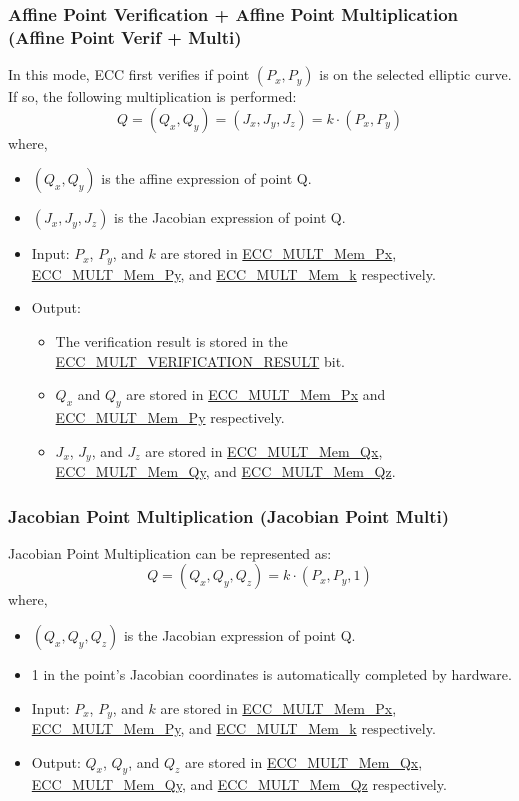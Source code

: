 \documentclass[main\_\_EN.tex]{subfiles}
\begin{document}
\subsubsection{Affine Point Verification + Affine Point Multiplication (Affine Point Verif + Multi)}

In this mode, ECC first verifies if point $(P_x,P_y)$ is on the selected elliptic curve. If so, the following multiplication is performed:
\[
Q = (Q_x,Q_y) = (J_x,J_y,J_z) = k \cdot (P_x,P_y)
\]
where,
\begin{itemize}
    \item $(Q_x,Q_y)$ is the affine expression of point Q.
    \item $(J_x,J_y,J_z)$ is the Jacobian expression of point Q.
    \item Input: $P_x$, $P_y$, and $k$ are stored in \hyperref[tab:ecc-memory]{ECC\_MULT\_Mem\_Px}, \hyperref[tab:ecc-memory]{ECC\_MULT\_Mem\_Py}, and \hyperref[tab:ecc-memory]{ECC\_MULT\_Mem\_k} respectively.
    \item Output:
    \begin{itemize}
        \item The verification result is stored in the \hyperref[fielddesc:ECCMULTVERIFICATIONRESULT]{ECC\_MULT\_VERIFICATION\_RESULT} bit.
        \item $Q_x$ and $Q_y$ are stored in \hyperref[tab:ecc-memory]{ECC\_MULT\_Mem\_Px} and \hyperref[tab:ecc-memory]{ECC\_MULT\_Mem\_Py} respectively.
        \item $J_x$, $J_y$, and $J_z$ are stored in \hyperref[tab:ecc-memory]{ECC\_MULT\_Mem\_Qx}, \hyperref[tab:ecc-memory]{ECC\_MULT\_Mem\_Qy}, and \hyperref[tab:ecc-memory]{ECC\_MULT\_Mem\_Qz}.
    \end{itemize}
\end{itemize}

\subsubsection{Jacobian Point Multiplication (Jacobian Point Multi)}

Jacobian Point Multiplication can be represented as:
\[
Q = (Q_x,Q_y,Q_z) = k \cdot (P_x,P_y,1)
\]
where,
\begin{itemize}
    \item $(Q_x,Q_y,Q_z)$ is the Jacobian expression of point Q.
    \item 1 in the point's Jacobian coordinates is automatically completed by hardware.
    \item Input: $P_x$, $P_y$, and $k$ are stored in \hyperref[tab:ecc-memory]{ECC\_MULT\_Mem\_Px}, \hyperref[tab:ecc-memory]{ECC\_MULT\_Mem\_Py}, and \hyperref[tab:ecc-memory]{ECC\_MULT\_Mem\_k} respectively.
    \item Output: $Q_x$, $Q_y$, and $Q_z$ are stored in \hyperref[tab:ecc-memory]{ECC\_MULT\_Mem\_Qx}, \hyperref[tab:ecc-memory]{ECC\_MULT\_Mem\_Qy}, and \hyperref[tab:ecc-memory]{ECC\_MULT\_Mem\_Qz} respectively.
\end{itemize}
\end{document}
